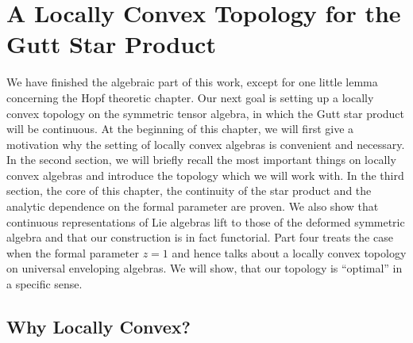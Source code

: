 
%
%

\chapter{A Locally Convex Topology for the Gutt Star Product}

We have finished the algebraic part of this work, except for one little 
lemma concerning the Hopf theoretic chapter. Our next goal is setting up a 
locally convex topology on the symmetric tensor algebra, in which the Gutt 
star product will be continuous. At the beginning of this chapter, we will 
first give a motivation why the setting of locally convex algebras is 
convenient and necessary. In the second section, we will briefly recall the 
most important things on locally convex algebras and introduce the topology 
which we will work with. In the third section, the core of this chapter, the 
continuity of the star product and the analytic dependence on the formal 
parameter are proven. We also show that continuous representations of Lie 
algebras lift to  those of the deformed symmetric algebra and that our 
construction is in fact functorial. Part four treats the case when the formal 
parameter $z = 1$ and hence talks about a locally convex topology on universal 
enveloping algebras. We will show, that our topology is ``optimal'' in a 
specific sense.



\section{Why Locally Convex?}
\label{sec:chap5_Prelim}

